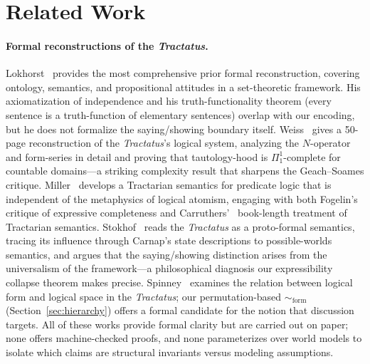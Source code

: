 \documentclass[jsl,bibother]{asl}
\theoremstyle{definition}
\theoremstyle{remark}
\newcommand{\formEq}{\sim_{\mathrm{form}}}
\begin{document}
\section{Related Work}
\label{sec:related}

\paragraph{Formal reconstructions of the \emph{Tractatus}.}
Lokhorst~\cite{lokhorst1988} provides the most comprehensive
prior formal reconstruction, covering ontology, semantics, and
propositional attitudes in a set-theoretic framework.  His
axiomatization of independence and his truth-functionality
theorem (every sentence is a truth-function of elementary
sentences) overlap with our encoding, but he does not formalize
the saying/showing boundary itself.
Weiss~\cite{weiss2017} gives a 50-page reconstruction of the
\emph{Tractatus}'s logical system, analyzing the $N$-operator
and form-series in detail and proving that tautology-hood is
$\Pi^1_1$-complete for countable domains---a striking
complexity result that sharpens the Geach--Soames critique.
Miller~\cite{miller1995} develops a Tractarian semantics for
predicate logic that is independent of the metaphysics of
logical atomism, engaging with both Fogelin's~\cite{fogelin1987}
critique of expressive completeness and Carruthers'~\cite{carruthers1989}
book-length treatment of Tractarian semantics.
Stokhof~\cite{stokhof2008} reads the \emph{Tractatus} as a
proto-formal semantics, tracing its influence through Carnap's
state descriptions to possible-worlds semantics, and argues
that the saying/showing distinction arises from the
universalism of the framework---a philosophical diagnosis our
expressibility collapse theorem makes precise.
Spinney~\cite{spinney2022} examines the relation between logical
form and logical space in the \emph{Tractatus}; our
permutation-based $\formEq$ (Section~\ref{sec:hierarchy})
offers a formal candidate for the notion that discussion
targets.
All of these works provide formal clarity but are carried out
on paper; none offers machine-checked proofs, and none
parameterizes over world models to isolate which claims are
structural invariants versus modeling assumptions.
\end{document}
